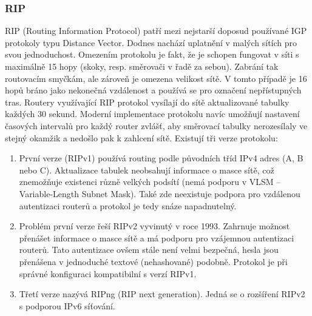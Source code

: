 \subsubsection{RIP}
RIP (Routing Information Protocol) patří mezi nejstarší doposud používané IGP protokoly typu Distance Vector. Dodnes nachází uplatnění v malých sítích pro svou jednoduchost. Omezením protokolu je fakt, že je schopen fungovat v síti s maximálně 15 hopy (skoky, resp. směrovači v řadě za sebou). Zabrání tak routovacím smyčkám, ale zároveň je omezena velikost sítě. V tomto případě je 16 hopů bráno jako nekonečná vzdálenost a používá se pro označení nepřístupných tras. Routery využívající RIP protokol vysílají do sítě aktualizované tabulky každých 30 sekund. Moderní implementace protokolu navíc umožňují nastavení časových intervalů pro každý router zvlášť, aby směrovací tabulky nerozesílaly ve stejný okamžik a nedošlo pak k zahlcení sítě. Existují tři verze protokolu:
\begin{enumerate}
    \item První verze (RIPv1) používá routing podle původních tříd IPv4 adres (A, B nebo C). Aktualizace tabulek neobsahují informace o masce sítě, což znemožňuje existenci různě velkých podsítí (nemá podporu v VLSM – Variable-Length Subnet Mask). Také zde neexistuje podpora pro vzdálenou autentizaci routerů a protokol je tedy snáze napadnutelný.
    \item Problém první verze řeší RIPv2 vyvinutý v roce 1993. Zahrnuje možnost přenášet informace o masce sítě a má podporu pro vzájemnou autentizaci routerů. Tato autentizace ovšem stále není velmi bezpečná, hesla jsou přenášena v jednoduché textové (nehashované) podobně. Protokol je při správné konfiguraci kompatibilní s verzí RIPv1.
    \item Třetí verze nazývá RIPng (RIP next generation). Jedná se o rozšíření RIPv2 s podporou IPv6 síťování.
\end{enumerate}
